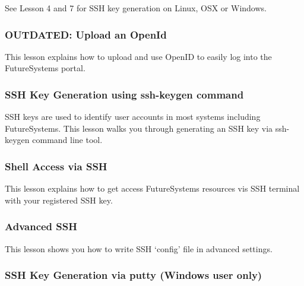 See Lesson 4 and 7 for SSH key generation on Linux, OSX or Windows.


\subsubsection{OUTDATED: Upload an
OpenId}\label{outdated-upload-an-openid}

This lesson explains how to upload and use OpenID to easily log into the
FutureSystems portal.


\subsubsection{SSH Key Generation using ssh-keygen
command}\label{ssh-key-generation-using-ssh-keygen-command}

SSH keys are used to identify user accounts in most systems including
FutureSystems. This lesson walks you through generating an SSH key via
ssh-keygen command line tool.


\subsubsection{Shell Access via SSH}\label{shell-access-via-ssh}

This lesson explains how to get access FutureSystems resources vis SSH
terminal with your registered SSH key.


\subsubsection{Advanced SSH}\label{advanced-ssh}

This lesson shows you how to write SSH `config' file in advanced
settings.


\subsubsection{SSH Key Generation via putty (Windows user
only)}\label{ssh-key-generation-via-putty-windows-user-only}


